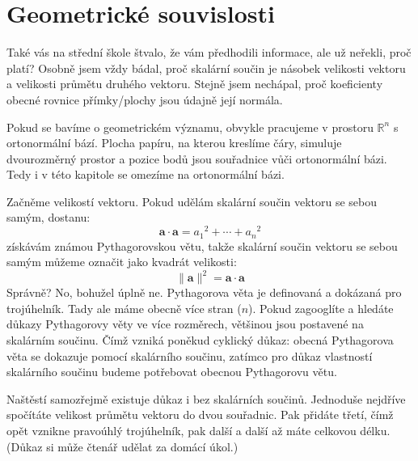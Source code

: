 \documentclass[a5paper,12pt]{amsbook}
\theoremstyle{definition}
\newcommand{\myvec}[1]{\mathbf{#1}}
\begin{document}
\section{Geometrické souvislosti}

\noindent Také vás na střední škole štvalo, že vám předhodili informace, ale už neřekli, proč platí?
Osobně jsem vždy bádal, proč skalární součin je násobek velikosti vektoru a velikosti průmětu druhého
vektoru. Stejně jsem nechápal, proč koeficienty obecné rovnice přímky/plochy jsou údajně její normála.

\medskip\noindent
Pokud se bavíme o geometrickém významu, obvykle pracujeme v prostoru $\mathbb{R}^n$ s ortonormální
bází. Plocha papíru, na kterou kreslíme čáry, simuluje dvourozměrný prostor a pozice bodů jsou
souřadnice vůči ortonormální bázi. Tedy i v této kapitole se omezíme na ortonormální bázi.

Začněme velikostí vektoru. Pokud udělám skalární součin vektoru se sebou samým, dostanu:
\begin{equation*}
\myvec{a}\cdot\myvec{a} = {a_1}^2 + \cdots + {a_n}^2
\end{equation*}
získávám známou Pythagorovskou větu, takže skalární součin vektoru se sebou samým můžeme označit
jako kvadrát velikosti:
\begin{equation*}
\|\myvec{a}\|^2 = \myvec{a}\cdot\myvec{a}
\end{equation*}
Správně? No, bohužel úplně ne. Pythagorova věta je definovaná a dokázaná pro trojúhelník. Tady ale máme
obecně více stran ($n$). Pokud zagooglíte a hledáte důkazy Pythagorovy věty ve více rozměrech,
většinou jsou postavené na skalárním součinu. Čímž vzniká poněkud cyklický důkaz: obecná Pythagorova
věta se dokazuje pomocí skalárního součinu, zatímco pro důkaz vlastností skalárního součinu budeme
potřebovat obecnou Pythagorovu větu.

Naštěstí samozřejmě existuje důkaz i bez skalárních součinů. Jednoduše nejdříve spočítáte velikost
průmětu vektoru do dvou souřadnic. Pak přidáte třetí, čímž opět vznikne pravoúhlý trojúhelník, pak
další a další až máte celkovou délku. (Důkaz si může čtenář udělat za domácí úkol.)
\end{document}
